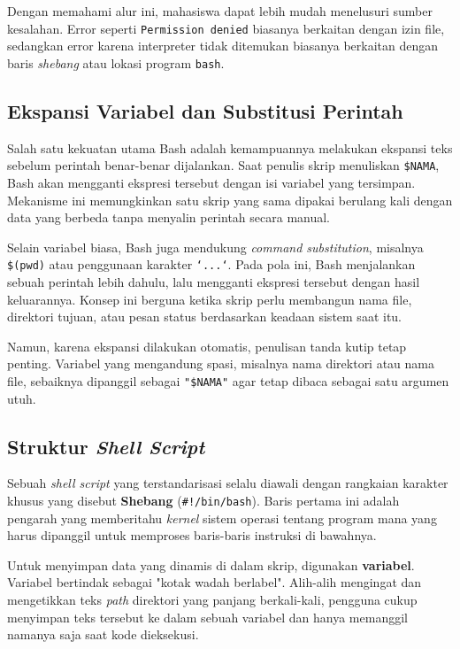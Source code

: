 Dengan memahami alur ini, mahasiswa dapat lebih mudah menelusuri sumber kesalahan. Error seperti \texttt{Permission denied} biasanya berkaitan dengan izin file, sedangkan error karena interpreter tidak ditemukan biasanya berkaitan dengan baris \textit{shebang} atau lokasi program \texttt{bash}.

\subsection{Ekspansi Variabel dan Substitusi Perintah}
Salah satu kekuatan utama Bash adalah kemampuannya melakukan ekspansi teks sebelum perintah benar-benar dijalankan. Saat penulis skrip menuliskan \texttt{\$NAMA}, Bash akan mengganti ekspresi tersebut dengan isi variabel yang tersimpan. Mekanisme ini memungkinkan satu skrip yang sama dipakai berulang kali dengan data yang berbeda tanpa menyalin perintah secara manual.

Selain variabel biasa, Bash juga mendukung \textit{command substitution}, misalnya \texttt{\$(pwd)} atau penggunaan karakter \texttt{`...`}. Pada pola ini, Bash menjalankan sebuah perintah lebih dahulu, lalu mengganti ekspresi tersebut dengan hasil keluarannya. Konsep ini berguna ketika skrip perlu membangun nama file, direktori tujuan, atau pesan status berdasarkan keadaan sistem saat itu.

Namun, karena ekspansi dilakukan otomatis, penulisan tanda kutip tetap penting. Variabel yang mengandung spasi, misalnya nama direktori atau nama file, sebaiknya dipanggil sebagai \texttt{"\$NAMA"} agar tetap dibaca sebagai satu argumen utuh.

\subsection{Struktur \textit{Shell Script}}



Sebuah \textit{shell script} yang terstandarisasi selalu diawali dengan rangkaian karakter khusus yang disebut \textbf{Shebang} (\texttt{\#!/bin/bash}). Baris pertama ini adalah pengarah yang memberitahu \textit{kernel} sistem operasi tentang program mana yang harus dipanggil untuk memproses baris-baris instruksi di bawahnya.

Untuk menyimpan data yang dinamis di dalam skrip, digunakan \textbf{variabel}. Variabel bertindak sebagai "kotak wadah berlabel". Alih-alih mengingat dan mengetikkan teks \textit{path} direktori yang panjang berkali-kali, pengguna cukup menyimpan teks tersebut ke dalam sebuah variabel dan hanya memanggil namanya saja saat kode dieksekusi.

